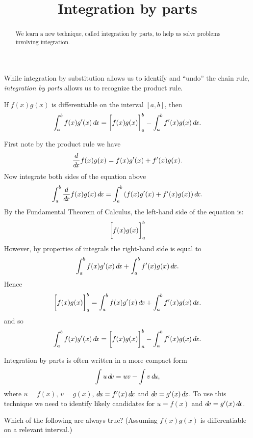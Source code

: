 \documentclass{ximera}
\title[Dig-In:]{Integration by parts}
\begin{document}
\begin{abstract}
  We learn a new technique, called integration by parts, to help us solve
  problems involving integration.
\end{abstract}
\maketitle


While integration by substitution allows us to identify and ``undo''
the chain rule, \textit{integration by parts} allows us to recognize
the product rule.

\begin{theorem} 
If $f(x)g(x)$ is differentiable on the interval $[a,b]$, then
\[
\int_a^b f(x) g'(x) \mathop{}\!d\! x =\bigg[ f(x)g(x) \bigg]_a^b - \int_a^b f'(x) g(x) \mathop{}\!d\! x.
\]
\begin{explanation} First note by the product rule we have
\[
\frac{d}{\mathop{}\!d\! x} f(x)g(x) = f(x)g'(x) + f'(x) g(x).
\]
Now integrate both sides of the equation above
\[
\int_a^b \frac{d}{\mathop{}\!d\! x} f(x) g(x) \mathop{}\!d\! x = \int_a^b \left(f(x)g'(x) + f'(x) g(x)\right) \mathop{}\!d\! x.
\]
By the Fundamental Theorem of Calculus, the left-hand side of the equation is:
\[
\bigg[ f(x)g(x) \bigg]_a^b
\]
However, by properties of integrals the right-hand side is equal to 
\[
\int_a^b f(x)g'(x)\mathop{}\!d\! x + \int_a^b f'(x) g(x) \mathop{}\!d\! x.
\]
Hence
\[
\bigg[ f(x)g(x) \bigg]_a^b = \int_a^b f(x)g'(x)\mathop{}\!d\! x + \int_a^b f'(x) g(x) \mathop{}\!d\! x.
\]
and so 
\[
 \int_a^b f(x)g'(x)\mathop{}\!d\! x = \bigg[ f(x)g(x) \bigg]_a^b -  \int_a^b f'(x) g(x) \mathop{}\!d\! x.
\]
\end{explanation}
\end{theorem}


Integration by parts is often written in a more compact form
\[
\int u\mathop{}\!d\! v = uv-\int v\mathop{}\!d\! u,
\]
where $u=f(x)$, $v=g(x)$, $\mathop{}\!d\! u=f'(x)\mathop{}\!d\! x$ and $\mathop{}\!d\! v=g'(x)\mathop{}\!d\! x$.  To use
this technique we need to identify likely candidates for $u=f(x)$ and
$\mathop{}\!d\! v=g'(x)\mathop{}\!d\! x$.

\begin{question}
  Which of the following are always true? (Assuming $f(x)g(x)$ is
  differentiable on a relevant interval.)
  \begin{selectAll}
  \end{selectAll}
\end{question}
\end{document}
